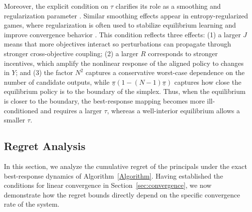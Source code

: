 \documentclass{article}
\newtheorem{theorem}{Theorem}
\begin{document}
Moreover, the explicit condition on \(\tau\) clarifies its role as a smoothing and regularization parameter \citep{mckelvey1995quantal}. Similar smoothing effects appear in entropy-regularized games, where regularization is often used to stabilize equilibrium learning and improve convergence behavior \citep{guo2022entropy}. This condition reflects three effects: (1) a larger \(J\) means that more objectives interact so perturbations can propagate through stronger cross-objective coupling; (2) a larger \(R\) corresponds to stronger incentives, which amplify the nonlinear response of the aligned policy to changes in \(Y\); and (3) the factor \(N^2\) captures a conservative worst-case dependence on the number of candidate outputs, while \(\underline\pi(1-(N-1)\underline\pi)\) captures how close the equilibrium policy is to the boundary of the simplex. Thus, when the equilibrium is closer to the boundary, the best-response mapping becomes more ill-conditioned and requires a larger \(\tau\), whereas a well-interior equilibrium allows a smaller \(\tau\).


\subsection{Regret Analysis}
\label{sec:regret}

In this section, we analyze the cumulative regret of the principals under the exact best-response dynamics of Algorithm~\ref{Algorithm}. Having established the conditions for linear convergence in Section~\ref{sec:convergence}, we now demonstrate how the regret bounds directly depend on the specific convergence rate of the system.
\end{document}
